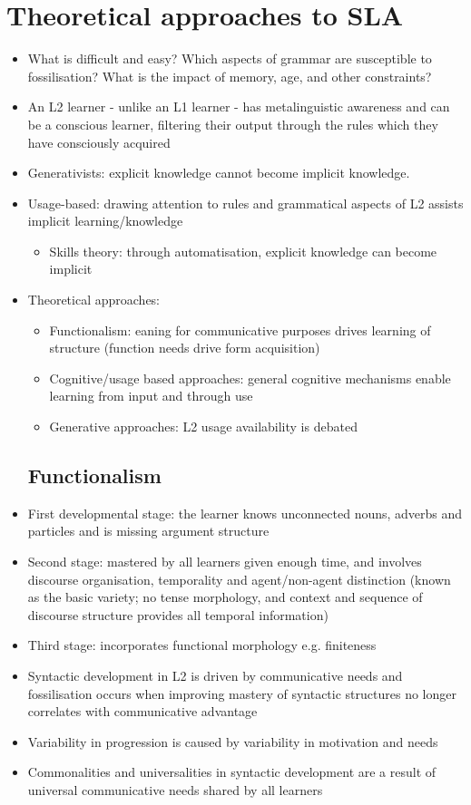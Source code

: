 \documentclass{article}
\begin{document}
\section{Theoretical approaches to SLA}
\begin{itemize}
\item What is difficult and easy? Which aspects of grammar are susceptible to fossilisation? What is the impact of memory, age, and other constraints?
\item An L2 learner - unlike an L1 learner - has metalinguistic awareness and can be a conscious learner, filtering their output through the rules which they have consciously acquired
\item Generativists: explicit knowledge cannot become implicit knowledge.
\item Usage-based: drawing attention to rules and grammatical aspects of L2 assists implicit learning/knowledge
\begin{itemize}
    \item Skills theory: through automatisation, explicit knowledge can become implicit
\end{itemize}
\item Theoretical approaches:
\begin{itemize}
    \item Functionalism: eaning for communicative purposes drives learning of structure (function needs drive form acquisition)
    \item Cognitive/usage based approaches: general cognitive mechanisms enable learning from input and through use
    \item Generative approaches: L2 usage availability is debated
\end{itemize}
\subsection{Functionalism}
    \item First developmental stage: the learner knows unconnected nouns, adverbs and particles and is missing argument structure 
    \item Second stage: mastered by all learners given enough time, and involves discourse organisation, temporality and agent/non-agent distinction (known as the basic variety; no tense morphology, and context and sequence of discourse structure provides all temporal information)
    \item Third stage: incorporates functional morphology e.g. finiteness
    \item Syntactic development in L2 is driven by communicative needs and fossilisation occurs when improving mastery of syntactic structures no longer correlates with communicative advantage
    \item Variability in progression is caused by variability in motivation and needs 
    \item Commonalities and universalities in syntactic development are a result of universal communicative needs shared by all learners

\end{itemize}
\end{document}
